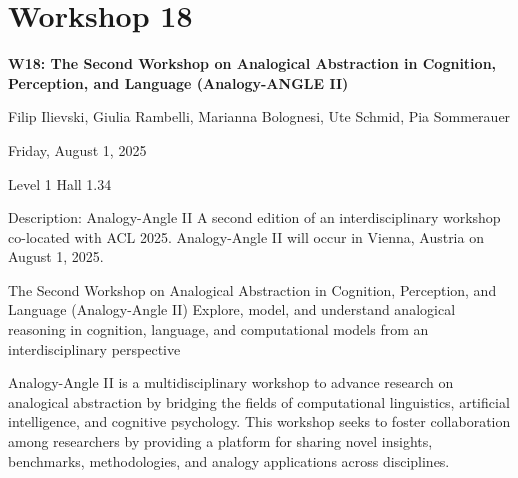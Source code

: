 \clearpage



\section[W18: The Second Workshop on Analogical Abstraction in Cognition, Perception, and Language (Analogy-ANGLE II)]{Workshop 18}

\begin{center}
    {\Large \textbf{W18: The Second Workshop on Analogical Abstraction in Cognition, Perception, and Language (Analogy-ANGLE II)}}

  Filip Ilievski, Giulia Rambelli, Marianna Bolognesi, Ute Schmid, Pia Sommerauer

    Friday, August 1, 2025
    
   Level 1 Hall 1.34
\end{center}

Description: Analogy-Angle II
A second edition of an interdisciplinary workshop co-located with ACL 2025. Analogy-Angle II will occur in Vienna, Austria on August 1, 2025.

The Second Workshop on Analogical Abstraction in Cognition, Perception, and Language (Analogy-Angle II)
Explore, model, and understand analogical reasoning in cognition, language, and computational models from an interdisciplinary perspective

Analogy-Angle II is a multidisciplinary workshop to advance research on analogical abstraction by bridging the fields of computational linguistics, artificial intelligence, and cognitive psychology. This workshop seeks to foster collaboration among researchers by providing a platform for sharing novel insights, benchmarks, methodologies, and analogy applications across disciplines.


